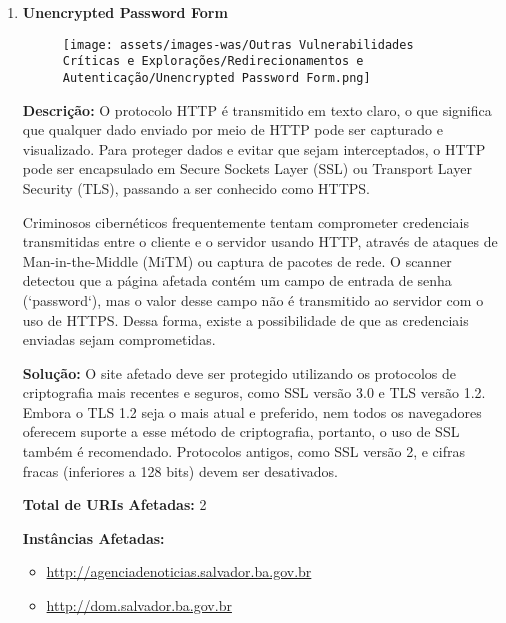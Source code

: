 \documentclass[a4paper,12pt]{article}
\begin{document}
\begin{enumerate}
\item \textbf{Unencrypted Password Form}

                        \begin{figure}[h!]
                        \centering
                        \texttt{[image: assets/images-was/Outras Vulnerabilidades Críticas e Explorações/Redirecionamentos e Autenticação/Unencrypted Password Form.png]}
                        \end{figure}
                        \FloatBarrier
                        \textbf{Descrição:} O protocolo HTTP é transmitido em texto claro, o que significa que qualquer dado enviado por meio de HTTP pode ser capturado e visualizado. Para proteger dados e evitar que sejam interceptados, o HTTP pode ser encapsulado em Secure Sockets Layer (SSL) ou Transport Layer Security (TLS), passando a ser conhecido como HTTPS.

    Criminosos cibernéticos frequentemente tentam comprometer credenciais transmitidas entre o cliente e o servidor usando HTTP, através de ataques de Man-in-the-Middle (MiTM) ou captura de pacotes de rede. O scanner detectou que a página afetada contém um campo de entrada de senha (`password`), mas o valor desse campo não é transmitido ao servidor com o uso de HTTPS. Dessa forma, existe a possibilidade de que as credenciais enviadas sejam comprometidas.

\textbf{Solução:} O site afetado deve ser protegido utilizando os protocolos de criptografia mais recentes e seguros, como SSL versão 3.0 e TLS versão 1.2. Embora o TLS 1.2 seja o mais atual e preferido, nem todos os navegadores oferecem suporte a esse método de criptografia, portanto, o uso de SSL também é recomendado. Protocolos antigos, como SSL versão 2, e cifras fracas (inferiores a 128 bits) devem ser desativados.

\textbf{Total de URIs Afetadas:} 2

\textbf{Instâncias Afetadas:}
\begin{itemize}
    \item \url{http://agenciadenoticias.salvador.ba.gov.br}
    \item \url{http://dom.salvador.ba.gov.br}
\end{itemize}

\end{enumerate}
\end{document}
